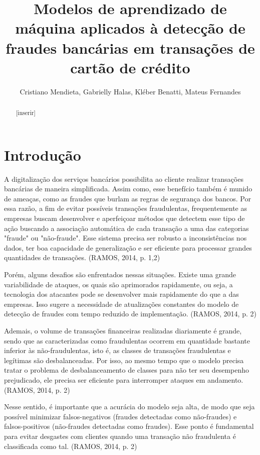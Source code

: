 \documentclass{article}
\title{Modelos de aprendizado de máquina aplicados à detecção de fraudes bancárias em transações de cartão de crédito}
\author{Cristiano Mendieta, Gabrielly Halas, Kléber Benatti, Mateus Fernandes}
\begin{document}
\maketitle

\begin{abstract}
[inserir]
\end{abstract}


\section{Introdução}

A digitalização dos serviços bancários possibilita ao cliente realizar transações bancárias de maneira simplificada. Assim como, esse benefício também é munido de ameaças, como as fraudes que burlam as regras de segurança dos bancos. Por essa razão, a fim de evitar possíveis transações fraudulentas, frequentemente as empresas buscam desenvolver e aperfeiçoar métodos que detectem esse tipo de ação buscando a associação automática de cada transação a uma das categorias "fraude" ou "não-fraude". Esse sistema precisa ser robusto a inconsistências nos dados, ter boa capacidade de generalização e ser eficiente para processar grandes quantidades de transações. (RAMOS, 2014, p. 1,2)

Porém, alguns desafios são enfrentados nessas situações. Existe uma grande variabilidade de ataques, os quais são aprimorados rapidamente, ou seja, a tecnologia dos atacantes pode se desenvolver mais rapidamente do que a das empresas. Isso sugere a necessidade de atualizações constantes do modelo de detecção de fraudes com tempo reduzido de implementação. (RAMOS, 2014, p. 2)

Ademais, o volume de transações financeiras realizadas diariamente é grande, sendo que as caracterizadas como fraudulentas ocorrem em quantidade bastante inferior às não-fraudulentas, isto é, as classes de transações fraudulentas e legítimas são desbalanceadas. Por isso, ao mesmo tempo que o modelo precisa tratar o problema de desbalanceamento de classes para não ter seu desempenho prejudicado, ele precisa ser eficiente para interromper ataques em andamento. (RAMOS, 2014, p. 2)

Nesse sentido, é importante que a acurácia do modelo seja alta, de modo que seja possível minimizar falsos-negativos (fraudes detectadas como não-fraudes) e falsos-positivos (não-fraudes detectadas como fraudes). Esse ponto é fundamental para evitar desgastes com clientes quando uma transação não fraudulenta é classificada como tal. (RAMOS, 2014, p. 2)
\end{document}

